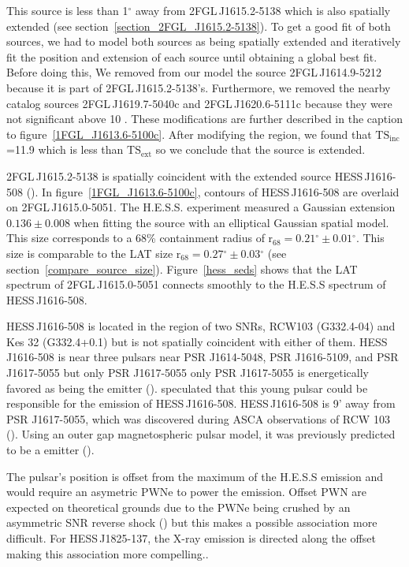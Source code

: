 \documentclass[12pt,preprint]{aastex}
\newcommand{\gev}{\text{GeV}\xspace}
\newcommand{\tev}{\text{TeV}\xspace}
\newcommand{\tsext}{{\ensuremath{\text{TS}_{\text{ext}}}}\xspace}
\newcommand{\tsinc}{\ensuremath{\text{TS}_{\text{inc}}}\xspace}
\newcommand{\rsixeight}{{\ensuremath{\text{r}_{68}}}\xspace}
\renewcommand{\deg}{\ensuremath{^\circ}\xspace}
\begin{document}
This source is less than 1\deg away from 2FGL\,J1615.2-5138 which is
also spatially extended (see section~\ref{section_2FGL_J1615.2-5138}).
To get a good fit of both sources, we had to model both sources as
being spatially extended and iteratively fit the position and extension
of each source until obtaining a global best fit.  Before doing this,
We removed from our model the source 2FGL\,J1614.9-5212 because it is
part of 2FGL\,J1615.2-5138's. Furthermore, we removed the nearby catalog
sources 2FGL\,J1619.7-5040c and 2FGL\,J1620.6-5111c because they were not
significant above 10 \gev.  These modifications are further described
in the caption to figure~\ref{1FGL_J1613.6-5100c}.  After modifying
the region, we found that \tsinc=11.9 which is less than \tsext so we
conclude that the source is extended.

2FGL\,J1615.2-5138 is spatially coincident with the extended
\tev source HESS\,J1616-508 (\cite{hess_plane_survey}).  In
figure~\ref{1FGL_J1613.6-5100c}, contours of HESS\,J1616-508 are overlaid
on 2FGL\,J1615.0-5051.  The H.E.S.S. experiment measured a Gaussian
extension $0.136\pm 0.008$ when fitting the source with an elliptical
Gaussian spatial model.  This size corresponds to a 68\% containment
radius of $\rsixeight=0.21\deg\pm0.01\deg$. This size is comparable to the LAT
size $\rsixeight=0.27\deg\pm0.03\deg$ (see section~\ref{compare_source_size}).
Figure~\ref{hess_seds} shows that the LAT spectrum of 2FGL\,J1615.0-5051
connects smoothly to the H.E.S.S spectrum of HESS\,J1616-508.

HESS\,J1616-508 is located in the region of two SNRs, RCW103 (G332.4-04)
and Kes 32 (G332.4+0.1) but is not spatially coincident with either
of them.  HESS\,J1616-508 is near three pulsars near PSR J1614-5048,
PSR J1616-5109, and PSR J1617-5055 but only PSR J1617-5055 only
PSR J1617-5055 is energetically favored as being the \tev emitter
(\cite{integral_HESS_J1616-508}).  \cite{hess_plane_survey}
speculated that this young pulsar could be responsible for the
emission of HESS\,J1616-508.  HESS\,J1616-508 is 9' away from PSR
J1617-5055, which was discovered during ASCA observations of RCW 103
(\cite{discovery_of_PSR_J1617-5055}). Using an outer gap magnetospheric
pulsar model, it was previously predicted to be a \tev emitter
(\cite{pulsar_tev_emission_predictions}).

The pulsar's position is offset from the maximum of the H.E.S.S
emission and would require an asymetric PWNe to power the \tev
emission. Offset PWN are expected on theoretical grounds due
to the PWNe being crushed by an asymmetric SNR reverse shock
(\cite{offset_pwn_ahronian,offset_pwn_blondin}) but this makes a
possible association more difficult.  For HESS\,J1825-137, the X-ray
emission is directed along the \tev offset making this association more
compelling.\cite{hess_j1825_hess}.
\end{document}
